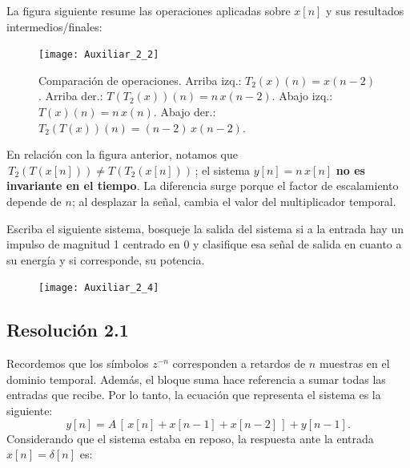 \documentclass[
  11pt,
  letterpaper,
   addpoints,
  ]{exam}
\begin{document}
\begin{questions}
\begin{solution}
La figura siguiente resume las operaciones aplicadas sobre $x[n]$ y sus resultados intermedios/finales:

\begin{figure}[H]
  \centering
  \texttt{[image: Auxiliar\_2\_2]}
  \caption{Comparación de operaciones. Arriba izq.: $T_2(x)(n)=x(n-2)$. Arriba der.: $T(T_2(x))(n)=n\,x(n-2)$. Abajo izq.: $T(x)(n)=n\,x(n)$. Abajo der.: $T_2(T(x))(n)=(n-2)\,x(n-2)$.}
\end{figure}

En relación con la figura anterior, notamos que $\,T_2(T(x[n])) \neq T(T_2(x[n]))\,$; el sistema $y[n]=n\,x[n]$ \textbf{no es invariante en el tiempo}. La diferencia surge porque el factor de escalamiento depende de $n$; al desplazar la señal, cambia el valor del multiplicador temporal.
\end{solution}
\question Escriba el siguiente sistema, bosqueje la salida del sistema si a la entrada hay un impulso de magnitud 1 centrado en 0 y clasifique esa señal de salida en cuanto a su energía y si corresponde, su potencia.
\begin{figure}[H]
  \centering
  \texttt{[image: Auxiliar\_2\_4]}
\end{figure}
\begin{solution}
\subsection*{Resolución 2.1}
Recordemos que los símbolos $z^{-n}$ corresponden a retardos de $n$ muestras en el dominio temporal. Además, el bloque suma hace referencia a sumar todas las entradas que recibe. Por lo tanto, la ecuación que representa el sistema es la siguiente:
\begin{equation}
y[n] = A\,[\,x[n] + x[n-1] + x[n-2]\,] + y[n-1].
\end{equation}
Considerando que el sistema estaba en reposo, la respuesta ante la entrada $x[n] = \delta[n]$ es:


\end{solution}
\end{questions}
\end{document}
